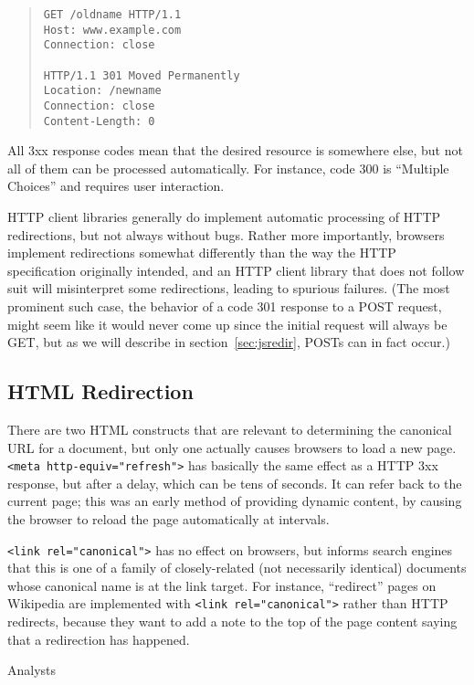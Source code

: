 \documentclass[oneside]{zarticle}
\begin{document}
\begin{quote}
\begin{verbatim}
GET /oldname HTTP/1.1
Host: www.example.com
Connection: close

HTTP/1.1 301 Moved Permanently
Location: /newname
Connection: close
Content-Length: 0
\end{verbatim}
\end{quote}

All 3xx response codes mean that the desired resource is somewhere
else, but not all of them can be processed automatically.  For
instance, code 300 is “Multiple Choices” and requires user
interaction.

HTTP client libraries generally do implement automatic processing of
HTTP redirections, but not always without bugs.  Rather more
importantly, browsers implement redirections somewhat differently than
the way the HTTP specification originally intended, and an HTTP client
library that does not follow suit will misinterpret some redirections,
leading to spurious failures.  (The most prominent such case, the
behavior of a code 301 response to a POST request, might seem like it
would never come up since the initial request will always be GET, but
as we will describe in section~\ref{sec:jsredir}, POSTs can in fact
occur.)

\subsection{HTML Redirection}

There are two HTML constructs that are relevant to determining the
canonical URL for a document, but only one actually causes browsers to
load a new page.  \verb|<meta http-equiv="refresh">| has basically the
same effect as a HTTP 3xx response, but after a delay, which can be
tens of seconds.  It can refer back to the current page; this was an
early method of providing dynamic content, by causing the browser to
reload the page automatically at intervals.

\verb|<link rel="canonical">| has no effect on browsers, but informs
search engines that this is one of a family of closely-related (not
necessarily identical) documents whose canonical name is at the link
target. For instance, “redirect” pages on Wikipedia are implemented
with \verb|<link rel="canonical">| rather than HTTP redirects, because
they want to add a note to the top of the page content saying that a
redirection has happened.

Analysts 
\end{document}

